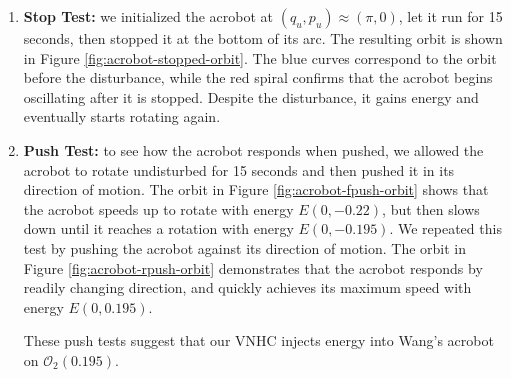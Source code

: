 \documentclass[journal,twoside,web]{ieeecolor}
\begin{document}
\begin{enumerate}
\item \textbf{Stop Test:}
    we initialized the acrobot at 
    \((q_u,p_u) \approx \left(\pi,0\right)\), let it run for 15
    seconds, then stopped it at the bottom of its arc.
    The resulting orbit is shown in Figure \ref{fig:acrobot-stopped-orbit}.
    The blue curves correspond to the orbit before the disturbance, while the red
    spiral confirms that the acrobot begins oscillating after it is stopped.
    Despite the disturbance, it gains energy and eventually starts rotating
    again.

\item \textbf{Push Test:}
    to see how the acrobot responds when pushed, we allowed
    the acrobot to rotate undisturbed for 15 seconds and then pushed it in its
    direction of motion.
    The orbit in Figure \ref{fig:acrobot-fpush-orbit} shows that the acrobot speeds
    up to rotate with energy \(E(0,-0.22)\), but then slows down until it reaches a
    rotation with energy \(E(0,-0.195)\).
    We repeated this test by pushing the acrobot against its direction of motion.
    The orbit in Figure \ref{fig:acrobot-rpush-orbit} demonstrates that the acrobot
    responds by readily changing direction, and quickly achieves its maximum speed
    with energy \(E(0,0.195)\).

    These push tests suggest that our VNHC injects energy into Wang's acrobot on
    \(\mathcal{O}_2(0.195)\).
\end{enumerate}
\end{document}
